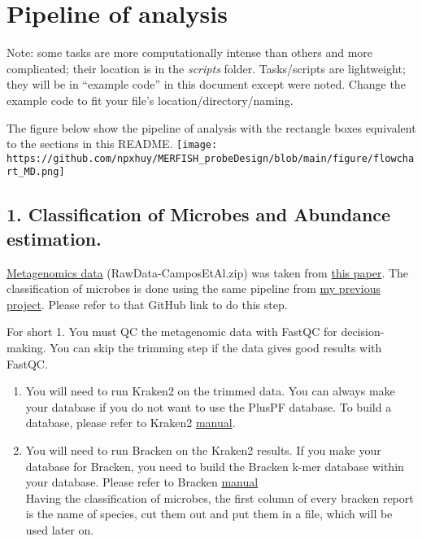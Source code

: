 \documentclass[
]{article}
\author{}
\date{}
\begin{document}
\section{Pipeline of analysis}\label{pipeline-of-analysis}

Note: some tasks are more computationally intense than others and more
complicated; their location is in the \emph{scripts} folder.
Tasks/scripts are lightweight; they will be in ``example code'' in this
document except were noted. Change the example code to fit your file's
location/directory/naming.

The figure below show the pipeline of analysis with the rectangle boxes
equivalent to the sections in this README.
\texttt{[image: https://github.com/npxhuy/MERFISH\_probeDesign/blob/main/figure/flowchart\_MD.png]}

\subsection{1. Classification of Microbes and Abundance
estimation.}\label{classification-of-microbes-and-abundance-estimation.}

\href{https://biorg.cs.fiu.edu/Smoking/}{Metagenomics data}
(RawData-CamposEtAl.zip) was taken from
\href{https://www.microbiologyresearch.org/content/journal/acmi/10.1099/acmi.0.000497.v3\#R52}{this
paper}. The classification of microbes is done using the same pipeline
from \href{https://github.com/npxhuy/microbiome}{my previous project}.
Please refer to that GitHub link to do this step.

For short 1. You must QC the metagenomic data with FastQC for
decision-making. You can skip the trimming step if the data gives good
results with FastQC.

\begin{enumerate}
\def\labelenumi{\arabic{enumi}.}
\setcounter{enumi}{1}
\item
  You will need to run Kraken2 on the trimmed data. You can always make
  your database if you do not want to use the PlusPF database. To build
  a database, please refer to Kraken2
  \href{https://github.com/DerrickWood/kraken2/blob/master/docs/MANUAL.markdown}{manual}.
\item
  You will need to run Bracken on the Kraken2 results. If you make your
  database for Bracken, you need to build the Bracken k-mer database
  within your database. Please refer to Bracken
  \href{https://github.com/jenniferlu717/Bracken}{manual}\\
  Having the classification of microbes, the first column of every
  bracken report is the name of species, cut them out and put them in a
  file, which will be used later on.
\end{enumerate}
\end{document}
